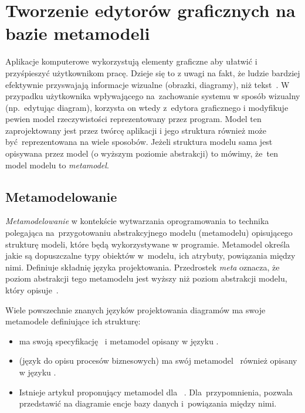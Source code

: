 \chapter{Tworzenie edytorów graficznych na bazie metamodeli}

Aplikacje komputerowe wykorzystują elementy graficzne aby ułatwić i
przyśpieszyć użytkownikom pracę.
Dzieje się to z uwagi na fakt, że ludzie bardziej efektywnie przyswajają
informacje wizualne (obrazki, diagramy), niż
tekst~\cite{images-more-effective-article}.
W przypadku użytkownika
wpływającego na~zachowanie systemu w sposób wizualny (np.\ edytując diagram),
korzysta on wtedy z~edytora graficznego i modyfikuje pewien model
rzeczywistości reprezentowany przez program. Model ten zaprojektowany jest
przez twórcę aplikacji i jego struktura również może być~reprezentowana na
wiele sposobów. Jeżeli struktura modelu sama jest opisywana przez model (o
wyższym poziomie abstrakcji) to mówimy, że~ten model modelu to
\emph{metamodel}.

\section{Metamodelowanie}

\emph{Metamodelowanie} w kontekście wytwarzania oprogramowania to
technika polegająca
na~przygotowaniu abstrakcyjnego modelu (metamodelu) opisującego strukturę
modeli, które będą wykorzystywane w programie. Metamodel określa jakie są
dopuszczalne typy obiektów w~modelu, ich atrybuty, powiązania między nimi.
Definiuje składnię języka projektowania. Przedrostek \emph{meta} oznacza, że
poziom abstrakcji tego metamodelu jest wyższy niż poziom abstrakcji modelu,
który opisuje~\cite{from-requirements-to-java-in-a-snap}.

Wiele powszechnie znanych języków projektowania diagramów ma swoje metamodele
definiujące ich strukturę:

\begin{itemize}
	\item {} ma swoją specyfikację~\cite{uml-omg-specification}
	      i metamodel opisany w języku .

	\item {} (język do opisu procesów biznesowych) ma swój
	      metamodel~\cite{bpmn2-metamodel} również opisany w języku .

	\item Istnieje artykuł proponujący metamodel dla ~\cite{entity-relationship-metamodel}. Dla~przypomnienia,  pozwala przedstawić na diagramie encje bazy danych i~powiązania między nimi.
\end{itemize}

